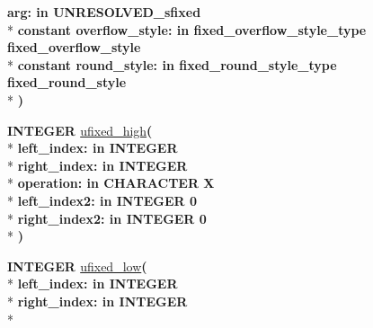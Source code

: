 \begin{DoxyCompactItemize}
{\bfseries \textcolor{vhdlchar}{arg\+: }\textcolor{stringliteral}{in }\textcolor{vhdlchar}{U\+N\+R\+E\+S\+O\+L\+V\+E\+D\+\_\+sfixed}}\\*
{\bfseries {\bfseries \textcolor{keywordflow}{constant}\textcolor{vhdlchar}{ }}\textcolor{vhdlchar}{overflow\+\_\+style\+: }\textcolor{stringliteral}{in }\textcolor{vhdlchar}{fixed\+\_\+overflow\+\_\+style\+\_\+type     fixed\+\_\+overflow\+\_\+style}}\\*
{\bfseries {\bfseries \textcolor{keywordflow}{constant}\textcolor{vhdlchar}{ }}\textcolor{vhdlchar}{round\+\_\+style\+: }\textcolor{stringliteral}{in }\textcolor{vhdlchar}{fixed\+\_\+round\+\_\+style\+\_\+type     fixed\+\_\+round\+\_\+style}}\\*
{\bfseries  )} 
\item 
{\bfseries {\bfseries \textcolor{comment}{I\+N\+T\+E\+G\+E\+R}\textcolor{vhdlchar}{ }}} \hyperlink{classfixed__pkg_ab7b73a5311a295da9f1c4e4fb4515ebb}{ufixed\+\_\+high}{\bfseries  ( }\\*
{\bfseries \textcolor{vhdlchar}{left\+\_\+index\+: }\textcolor{stringliteral}{in }{\bfseries \textcolor{comment}{I\+N\+T\+E\+G\+E\+R}\textcolor{vhdlchar}{ }}}\\*
{\bfseries \textcolor{vhdlchar}{right\+\_\+index\+: }\textcolor{stringliteral}{in }{\bfseries \textcolor{comment}{I\+N\+T\+E\+G\+E\+R}\textcolor{vhdlchar}{ }}}\\*
{\bfseries \textcolor{vhdlchar}{operation\+: }\textcolor{stringliteral}{in }\textcolor{vhdlchar}{C\+H\+A\+R\+A\+C\+T\+E\+R   \textquotesingle{}\+X\textquotesingle{}}}\\*
{\bfseries \textcolor{vhdlchar}{left\+\_\+index2\+: }\textcolor{stringliteral}{in }\textcolor{vhdlchar}{I\+N\+T\+E\+G\+E\+R   0}}\\*
{\bfseries \textcolor{vhdlchar}{right\+\_\+index2\+: }\textcolor{stringliteral}{in }\textcolor{vhdlchar}{I\+N\+T\+E\+G\+E\+R   0}}\\*
{\bfseries  )} 
\item 
{\bfseries {\bfseries \textcolor{comment}{I\+N\+T\+E\+G\+E\+R}\textcolor{vhdlchar}{ }}} \hyperlink{classfixed__pkg_a4d69efd65f02a7e7bdc4d70b13a6ec7e}{ufixed\+\_\+low}{\bfseries  ( }\\*
{\bfseries \textcolor{vhdlchar}{left\+\_\+index\+: }\textcolor{stringliteral}{in }{\bfseries \textcolor{comment}{I\+N\+T\+E\+G\+E\+R}\textcolor{vhdlchar}{ }}}\\*
{\bfseries \textcolor{vhdlchar}{right\+\_\+index\+: }\textcolor{stringliteral}{in }{\bfseries \textcolor{comment}{I\+N\+T\+E\+G\+E\+R}\textcolor{vhdlchar}{ }}}\\*

\end{DoxyCompactItemize}
